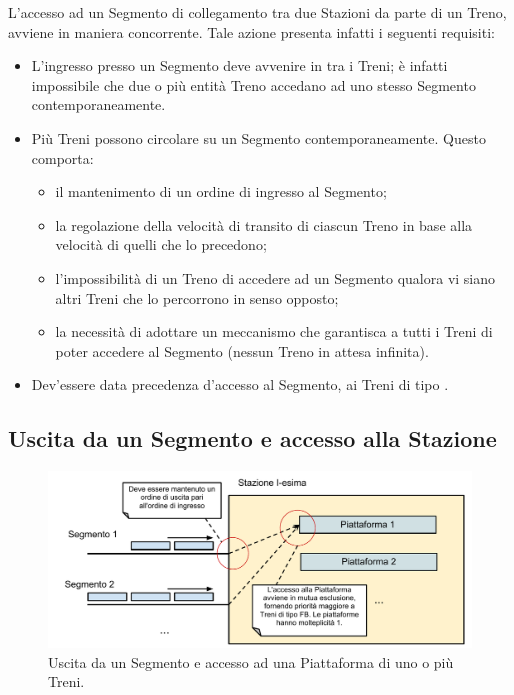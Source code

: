 	L'accesso ad un Segmento di collegamento tra due Stazioni da parte di un Treno, avviene in maniera concorrente. Tale azione presenta infatti i seguenti requisiti:
		\begin{itemize}
			\item L'ingresso presso un Segmento deve avvenire in  tra i Treni; è infatti impossibile che due o più entità Treno accedano ad uno stesso Segmento contemporaneamente.
			\item Più Treni possono circolare su un Segmento contemporaneamente. Questo comporta:
				\begin{itemize}
					\item il mantenimento di un ordine di ingresso al Segmento;
					\item la regolazione della velocità di transito di ciascun Treno in base alla velocità di quelli che lo precedono;
					\item l'impossibilità di un Treno di accedere ad un Segmento qualora vi siano altri Treni che lo percorrono in senso opposto;
					\item la necessità di adottare un meccanismo che garantisca a tutti i Treni di poter accedere al Segmento (nessun Treno in attesa infinita).
				\end{itemize}
			\item Dev'essere data precedenza d'accesso al Segmento, ai Treni di tipo .
		\end{itemize}


	\subsection{Uscita da un Segmento e accesso alla Stazione}

	\begin{figure}[htbp]
		\includegraphics[width=\textwidth,keepaspectratio]{imgs/Ingresso_Stazione.pdf}
		\caption{\footnotesize{Uscita da un Segmento e accesso ad una Piattaforma di uno o più Treni.}}
	\end{figure}

